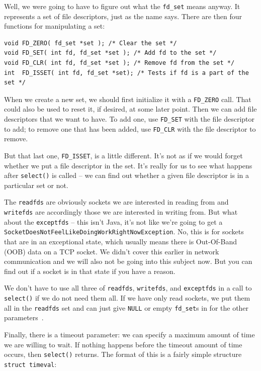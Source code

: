 \documentclass[a4paper]{report}
\begin{document}
Well, we were going to have to figure out what the \texttt{fd\_set} means anyway. It represents a set of file descriptors, just as the name says.  There are then four functions for manipulating a set:

\begin{lstlisting}
void FD_ZERO( fd_set *set ); /* Clear the set */
void FD_SET( int fd, fd_set *set ); /* Add fd to the set */
void FD_CLR( int fd, fd_set *set ); /* Remove fd from the set */
int  FD_ISSET( int fd, fd_set *set); /* Tests if fd is a part of the set */ 
\end{lstlisting}

When we create a new set, we should first initialize it with a \texttt{FD\_ZERO} call. That could also be used to reset it, if desired, at some later point. Then we can add file descriptors that we want to have. To add one, use \texttt{FD\_SET} with the file descriptor to add; to remove one that has been added, use \texttt{FD\_CLR} with the file descriptor to remove.

But that last one, \texttt{FD\_ISSET}, is a little different. It's not as if we would forget whether we put a file descriptor in the set. It's really for us to see what happens after \texttt{select()} is called -- we can find out whether a given file descriptor is in a particular set or not.

The \texttt{readfds} are obviously sockets we are interested in reading from and \texttt{writefds} are accordingly those we are interested in writing from. But what about the \texttt{exceptfds} -- this isn't Java, it's not like we're going to get a \texttt{SocketDoesNotFeelLikeDoingWorkRightNowException}. No, this is for sockets that are in an exceptional state, which usually means there is Out-Of-Band (OOB) data on a TCP socket. We didn't cover this earlier in network communication and we will also not be going into this subject now. But you can find out if a socket is in that state if you have a reason.

We don't have to use all three of \texttt{readfds}, \texttt{writefds}, and \texttt{exceptfds} in a call to \texttt{select()} if we do not need them all. If we have only read sockets, we put them all in the \texttt{readfds} set and can just give \texttt{NULL} or empty \texttt{fd\_set}s in for the other parameters~\cite{getaddrinfo}.

Finally, there is a timeout parameter: we can specify a maximum amount of time we  are willing to wait. If nothing happens before the timeout amount of time occurs, then \texttt{select()} returns. The format of this is a fairly simple structure \texttt{struct timeval}:
\end{document}
